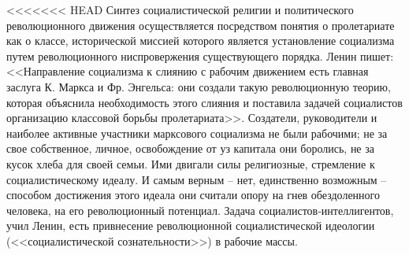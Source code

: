 \documentclass{book}
\begin{document}
<<<<<<< HEAD
Синтез социалистической религии и политического революционного движения осуществляется посредством понятия о пролетариате как о классе, исторической миссией которого является установление социализма путем революционного ниспровержения существующего порядка. Ленин пишет: <<Направ­ление социализма к слиянию с рабочим движением есть главная заслуга К. Маркса и Фр. Энгельса: они создали такую револю­ционную теорию, которая объяснила необходимость этого слия­ния и поставила задачей социалистов организацию классовой борьбы пролетариата>>. Создатели, руководители и наиболее активные участники марксового социализма не были рабочими; не за свое собственное, личное, освобождение от уз капитала они боролись, не за кусок хлеба для своей семьи. Ими двигали силы религиозные, стремление к социалистическому иде­алу. И самым верным -- нет, единственно возможным -- способом достижения этого идеала они считали опору на гнев обездоленного человека, на его революционный потенциал. Задача социалистов‑интеллигентов, учил Ленин, есть привнесение революционной социалистической идеологии (<<социалистической сознательности>>) в рабочие массы.
\end{document}
